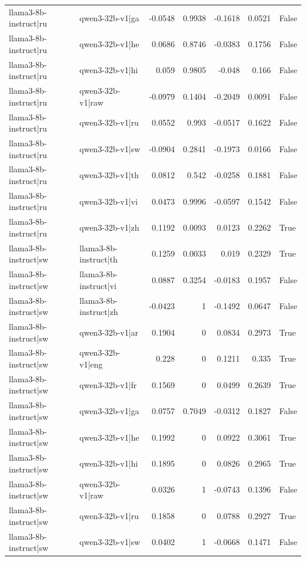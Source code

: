 \begin{table}
\begin{tabular}{l l r r r r l}
llama3-8b-instruct|ru & qwen3-32b-v1|ga & -0.0548 & 0.9938 & -0.1618 & 0.0521 & False \\
llama3-8b-instruct|ru & qwen3-32b-v1|he & 0.0686 & 0.8746 & -0.0383 & 0.1756 & False \\
llama3-8b-instruct|ru & qwen3-32b-v1|hi & 0.059 & 0.9805 & -0.048 & 0.166 & False \\
llama3-8b-instruct|ru & qwen3-32b-v1|raw & -0.0979 & 0.1404 & -0.2049 & 0.0091 & False \\
llama3-8b-instruct|ru & qwen3-32b-v1|ru & 0.0552 & 0.993 & -0.0517 & 0.1622 & False \\
llama3-8b-instruct|ru & qwen3-32b-v1|sw & -0.0904 & 0.2841 & -0.1973 & 0.0166 & False \\
llama3-8b-instruct|ru & qwen3-32b-v1|th & 0.0812 & 0.542 & -0.0258 & 0.1881 & False \\
llama3-8b-instruct|ru & qwen3-32b-v1|vi & 0.0473 & 0.9996 & -0.0597 & 0.1542 & False \\
llama3-8b-instruct|ru & qwen3-32b-v1|zh & 0.1192 & 0.0093 & 0.0123 & 0.2262 & True \\
llama3-8b-instruct|sw & llama3-8b-instruct|th & 0.1259 & 0.0033 & 0.019 & 0.2329 & True \\
llama3-8b-instruct|sw & llama3-8b-instruct|vi & 0.0887 & 0.3254 & -0.0183 & 0.1957 & False \\
llama3-8b-instruct|sw & llama3-8b-instruct|zh & -0.0423 & 1 & -0.1492 & 0.0647 & False \\
llama3-8b-instruct|sw & qwen3-32b-v1|ar & 0.1904 & 0 & 0.0834 & 0.2973 & True \\
llama3-8b-instruct|sw & qwen3-32b-v1|eng & 0.228 & 0 & 0.1211 & 0.335 & True \\
llama3-8b-instruct|sw & qwen3-32b-v1|fr & 0.1569 & 0 & 0.0499 & 0.2639 & True \\
llama3-8b-instruct|sw & qwen3-32b-v1|ga & 0.0757 & 0.7049 & -0.0312 & 0.1827 & False \\
llama3-8b-instruct|sw & qwen3-32b-v1|he & 0.1992 & 0 & 0.0922 & 0.3061 & True \\
llama3-8b-instruct|sw & qwen3-32b-v1|hi & 0.1895 & 0 & 0.0826 & 0.2965 & True \\
llama3-8b-instruct|sw & qwen3-32b-v1|raw & 0.0326 & 1 & -0.0743 & 0.1396 & False \\
llama3-8b-instruct|sw & qwen3-32b-v1|ru & 0.1858 & 0 & 0.0788 & 0.2927 & True \\
llama3-8b-instruct|sw & qwen3-32b-v1|sw & 0.0402 & 1 & -0.0668 & 0.1471 & False \\

\end{tabular}
\end{table}
